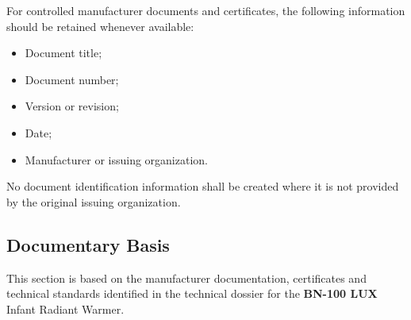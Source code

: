 For controlled manufacturer documents and certificates, the following
information should be retained whenever available:

\begin{itemize}

    \item Document title;

    \item Document number;

    \item Version or revision;

    \item Date;

    \item Manufacturer or issuing organization.

\end{itemize}

No document identification information shall be created where it is
not provided by the original issuing organization.

\subsection{Documentary Basis}

This section is based on the manufacturer documentation, certificates
and technical standards identified in the technical dossier for the
\textbf{BN-100 LUX} Infant Radiant Warmer.
